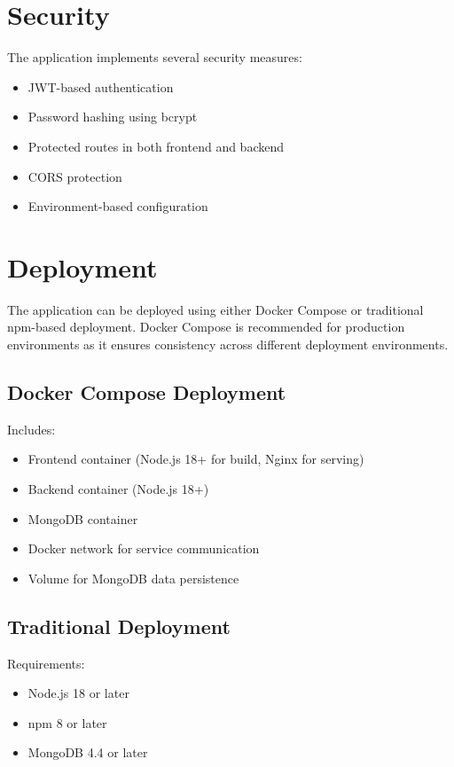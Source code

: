 \documentclass{article}
\begin{document}
\section{Security}
The application implements several security measures:
\begin{itemize}
    \item JWT-based authentication
    \item Password hashing using bcrypt
    \item Protected routes in both frontend and backend
    \item CORS protection
    \item Environment-based configuration
\end{itemize}

\section{Deployment}
The application can be deployed using either Docker Compose or traditional npm-based deployment. Docker Compose is recommended for production environments as it ensures consistency across different deployment environments.

\subsection{Docker Compose Deployment}
Includes:
\begin{itemize}
    \item Frontend container (Node.js 18+ for build, Nginx for serving)
    \item Backend container (Node.js 18+)
    \item MongoDB container
    \item Docker network for service communication
    \item Volume for MongoDB data persistence
\end{itemize}

\subsection{Traditional Deployment}
Requirements:
\begin{itemize}
    \item Node.js 18 or later
    \item npm 8 or later
    \item MongoDB 4.4 or later
\end{itemize}
\end{document}
